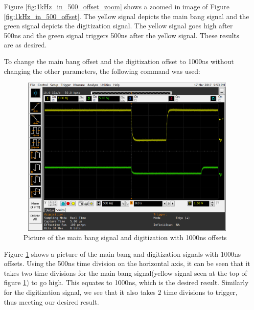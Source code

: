 \documentclass[12pt, a4paper]{article}
\begin{document}
	
Figure \ref{fig:1kHz_in_500_offset_zoom} shows a zoomed in image of Figure \ref{fig:1kHz_in_500_offset}. The yellow signal depicts the main bang signal and the green signal depicts the digitization signal. The yellow signal goes high after 500ns and the green signal triggers 500ns after the yellow signal. These results are as desired. 

To change the main bang offset and the digitization offset to 1000ns without changing the other parameters, the following command was used:


	
	\begin{figure}[t]
		\centering
		\includegraphics[width=13cm, height=8cm]{1khz_mb_offset_1000_ns_length_of_offset}
		\caption{Picture of the main bang signal and digitization with 1000ns offsets}
		\label{fig:1kHz_in_1000_offset}
	\end{figure}
	

Figure \ref{fig:1kHz_in_1000_offset} shows a picture of the main bang and digitization signals with 1000ns offsets. Using the 500ns time division on the horizontal axis, it can be seen that it takes two time divisions for the main bang signal(yellow signal seen at the top of figure \ref{fig:1kHz_in_1000_offset}) to go high. This equates to 1000ns, which is the desired result. Similarly for the digitization signal, we see that it also takes 2 time divisions to trigger, thus meeting our desired result. 
\end{document}
